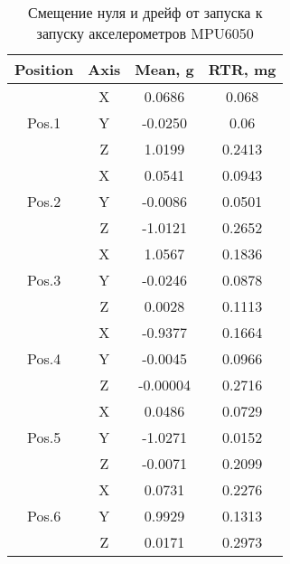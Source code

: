 \begin{table}[h!]
	\centering
	\caption{Смещение нуля и дрейф от запуска к запуску акселерометров MPU6050}
	\begin{tabular}{|c|c|c|c|}
	\hline
	Position & Axis & Mean, g & RTR, mg \\ \hline
	\multirow{3}{*}{Pos.1}	& X & 0.0686 & 0.068 \\											 
							\cline{2-4}
							& Y & -0.0250 & 0.06 \\												 
							\cline{2-4}
							& Z & 1.0199 & 0.2413 \\												 
	\hline
	\multirow{3}{*}{Pos.2}	& X & 0.0541 & 0.0943 \\												 
							\cline{2-4}
							& Y & -0.0086 & 0.0501 \\												 
							\cline{2-4}
							& Z & -1.0121 & 0.2652 \\												 
	\hline	
	\multirow{3}{*}{Pos.3}	& X & 1.0567 & 0.1836 \\												 
							\cline{2-4}
							& Y & -0.0246 & 0.0878 \\												 
							\cline{2-4}
							& Z & 0.0028 & 0.1113 \\												 
	\hline
	\multirow{3}{*}{Pos.4}	& X & -0.9377 & 0.1664 \\												 
							\cline{2-4}
							& Y & -0.0045 & 0.0966 \\												 
							\cline{2-4}
							& Z & -0.00004 & 0.2716 \\												 
	\hline
	\multirow{3}{*}{Pos.5}	& X & 0.0486 & 0.0729 \\												 
							\cline{2-4}
							& Y & -1.0271 & 0.0152 \\												 
							\cline{2-4}
							& Z & -0.0071 & 0.2099 \\												 
	\hline
	\multirow{3}{*}{Pos.6}	& X & 0.0731 & 0.2276 \\												 
							\cline{2-4}
							& Y & 0.9929 & 0.1313 \\												 
							\cline{2-4}
							& Z & 0.0171 & 0.2973 \\												 
	\hline
	\end{tabular}
	\label{table:acc_rtr}
\end{table}

